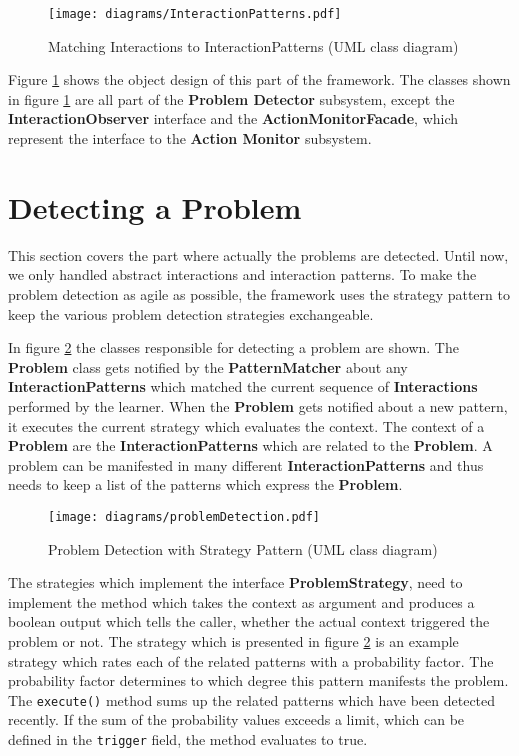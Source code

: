 \begin{figure}
    \centering
    \texttt{[image: diagrams/InteractionPatterns.pdf]}
    \caption[Matching Interactions to InteractionPatterns (UML class diagram)]
    {Matching Interactions to InteractionPatterns (UML class diagram)}
    \label{matching_interactions}
\end{figure}

Figure \ref{matching_interactions} shows the object design of this part of the
framework. The classes shown in figure \ref{matching_interactions} are all part of
the \textbf{Problem Detector} subsystem, except the
\textbf{InteractionObserver} interface and the \textbf{ActionMonitorFacade},
which represent the interface to the \textbf{Action Monitor} subsystem.

\section{Detecting a Problem}
This section covers the part where actually the problems are detected. Until
now, we only handled abstract interactions and interaction patterns. To make
the problem detection as agile as possible, the framework uses the strategy
pattern to keep the various problem detection strategies exchangeable.

In figure \ref{problem_detection} the classes responsible for detecting a
problem are shown. The \textbf{Problem} class gets notified by the
\textbf{PatternMatcher} about any \textbf{InteractionPatterns} which matched
the current sequence of \textbf{Interactions} performed by the learner. When
the \textbf{Problem} gets notified about a new pattern, it executes the
current strategy which evaluates the context. The context of a
\textbf{Problem} are the \textbf{InteractionPatterns} which are related to the
\textbf{Problem}. A problem can be manifested in many different
\textbf{InteractionPatterns} and thus needs to keep a list of the
patterns which express the \textbf{Problem}.

\begin{figure}
    \centering
    \texttt{[image: diagrams/problemDetection.pdf]}
    \caption[Problem Detection with Strategy Pattern (UML class diagram)]
    {Problem Detection with Strategy Pattern (UML class diagram)}
    \label{problem_detection}
\end{figure}

The strategies which implement the interface \textbf{ProblemStrategy}, need to
implement the method which takes the context as argument and produces a
boolean output which tells the caller, whether the actual context triggered the
problem or not. The strategy which is presented in figure
\ref{problem_detection} is an example strategy which rates each of the related
patterns with a probability factor. The probability factor determines to which
degree this pattern manifests the problem. The \verb=execute()= method sums up
the related patterns which have been detected recently. If the sum of the
probability values exceeds a limit, which can be defined in the \verb=trigger=
field, the method evaluates to true.
